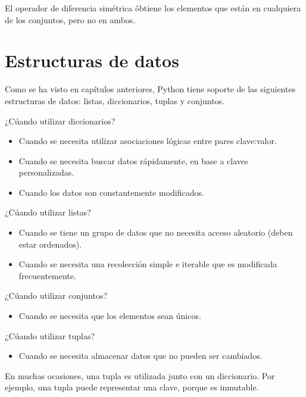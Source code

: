 \documentclass{report}
\begin{document}

El operador de diferencia simétrica \^ obtiene los elementos que están en cualquiera de los conjuntos, pero no en ambos.


\section{Estructuras de datos}


Como se ha visto en capítulos anteriores, Python tiene soporte de las siguientes estructuras de datos: listas, diccionarios, tuplas y conjuntos.

¿Cúando utilizar diccionarios?

\begin{itemize}
  \item Cuando se necesita utilizar asociaciones lógicas entre pares clave:valor.
  \item Cuando se necesita buscar datos rápidamente, en base a claves personalizadas.
  \item Cuando los datos son constantemente modificados.
\end{itemize}

¿Cúando utilizar listas?

\begin{itemize}
  \item Cuando se tiene un grupo de datos que no necesita acceso aleatorio (deben estar ordenados).
  \item Cuando se necesita una recolección simple e iterable que es modificada frecuentemente.
\end{itemize}

¿Cúando utilizar conjuntos?

\begin{itemize}
  \item Cuando se necesita que los elementos sean únicos.
\end{itemize}

¿Cúando utilizar tuplas?

\begin{itemize}
  \item Cuando se necesita almacenar datos que no pueden ser cambiados.
\end{itemize}

En muchas ocasiones, una tupla es utilizada junto con un diccionario. Por ejemplo, una tupla puede representar una clave, porque es inmutable.
\end{document}
